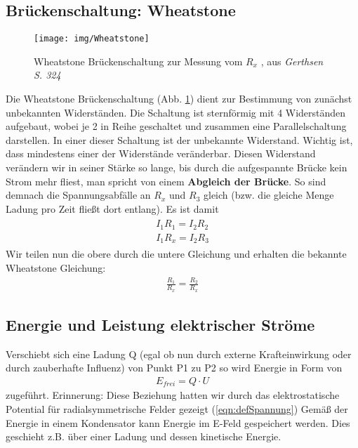 \subsection{Brückenschaltung: Wheatstone}
\begin{figure}\begin{center}
\texttt{[image: img/Wheatstone]}\end{center}
\caption{Wheatstone Brückenschaltung zur Messung vom $R_x$ , aus \textit{Gerthsen S. 324}}
\label{pic:Wheatstone}
\end{figure}
Die Wheatstone Brückenschaltung (Abb. \ref{pic:Wheatstone}) dient zur Bestimmung von zunächst unbekannten Widerständen. Die Schaltung ist sternförmig mit 4 Widerständen aufgebaut, wobei je 2 in Reihe geschaltet und zusammen eine Parallelschaltung darstellen.
In einer dieser Schaltung ist der unbekannte Widerstand. Wichtig ist, dass mindestens einer der Widerstände veränderbar.
Diesen Widerstand verändern wir in seiner Stärke so lange, bis durch die aufgespannte Brücke kein Strom mehr fliest, man spricht von einem \textbf{Abgleich der Brücke}.
So sind demnach die Spannungsabfälle an $R_x$ und $R_3$ gleich (bzw. die gleiche Menge Ladung pro Zeit fließt dort entlang). Es ist damit
\begin{align*} \begin{split}
I_1 R_1 = I_2 R_2 \\
I_1 R_x = I_2 R_3\end{split}
\end{align*}Wir  teilen nun die obere durch die untere Gleichung und erhalten die bekannte Wheatstone Gleichung:
\begin{align} \label{eqn:Wheatstone Schaltung}
\boxed{\frac{R_1}{R_x} = \frac{R_2}{R_x}}
\end{align}

\subsection{Energie und Leistung elektrischer Ströme}
Verschiebt sich eine Ladung Q (egal ob nun durch externe Krafteinwirkung oder durch zauberhafte Influenz) von Punkt P1 zu P2 so wird Energie in Form von 
\begin{align} \label{eqn:Energie el. Strom}
E_{frei} = Q\cdot U
\end{align}zugeführt. Erinnerung: Diese Beziehung hatten wir durch das elektrostatische Potential für radialsymmetrische Felder gezeigt (\ref{eqn:defSpannung})
Gemäß der Energie in einem Kondensator kann Energie im E-Feld gespeichert werden. Dies geschieht z.B. über einer Ladung und dessen kinetische Energie.

